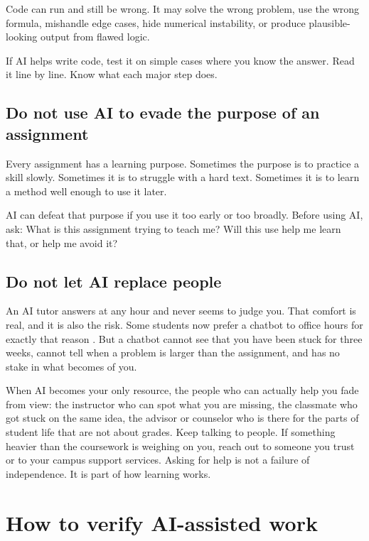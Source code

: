 \documentclass{SIAMbook2023}
\begin{document}
Code can run and still be wrong. It may solve the wrong problem, use the wrong formula, mishandle edge cases, hide numerical instability, or produce plausible-looking output from flawed logic.

If AI helps write code, test it on simple cases where you know the answer. Read it line by line. Know what each major step does.

\subsection{Do not use AI to evade the purpose of an assignment}
\label{subsec:evade-purpose}

Every assignment has a learning purpose. Sometimes the purpose is to practice a skill slowly. Sometimes it is to struggle with a hard text. Sometimes it is to learn a method well enough to use it later.

AI can defeat that purpose if you use it too early or too broadly. Before using AI, ask: What is this assignment trying to teach me? Will this use help me learn that, or help me avoid it?

\subsection{Do not let AI replace people}
\label{subsec:replace-people}%
%

An AI tutor answers at any hour and never seems to judge you. That comfort is real, and it is also the risk. Some students now prefer a chatbot to office hours for exactly that reason \citep{silva2025university}. But a chatbot cannot see that you have been stuck for three weeks, cannot tell when a problem is larger than the assignment, and has no stake in what becomes of you.

When AI becomes your only resource, the people who can actually help you fade from view: the instructor who can spot what you are missing, the classmate who got stuck on the same idea, the advisor or counselor who is there for the parts of student life that are not about grades. Keep talking to people. If something heavier than the coursework is weighing on you, reach out to someone you trust or to your campus support services. Asking for help is not a failure of independence. It is part of how learning works.

\section{How to verify AI-assisted work}
\label{sec:verification}%
\end{document}
